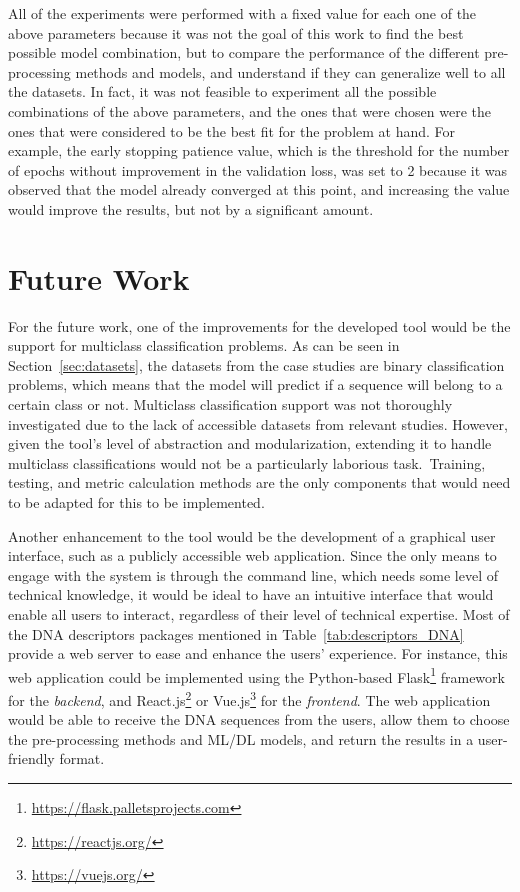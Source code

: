 All of the experiments were performed with a fixed value for each one of the above parameters because it was not the goal of this work to find the best possible model combination, but to compare the performance of the different pre-processing methods and models, and understand if they can generalize well to all the datasets. In fact, it was not feasible to experiment all the possible combinations of the above parameters, and the ones that were chosen were the ones that were considered to be the best fit for the problem at hand. For example, the early stopping patience value, which is the threshold for the number of epochs without improvement in the validation loss, was set to 2 because it was observed that the model already converged at this point, and increasing the value would improve the results, but not by a significant amount. 

\section{Future Work}

For the future work, one of the improvements for the developed tool would be the support for multiclass classification problems. As can be seen in Section~\ref{sec:datasets}, the datasets from the case studies are binary classification problems, which means that the model will predict if a sequence will belong to a certain class or not. Multiclass classification support was not thoroughly investigated due to the lack of accessible datasets from relevant studies. However, given the tool's level of abstraction and modularization, extending it to handle multiclass classifications would not be a particularly laborious task. Training, testing, and metric calculation methods are the only components that would need to be adapted for this to be implemented.

Another enhancement to the tool would be the development of a graphical user interface, such as a publicly accessible web application. Since the only means to engage with the system is through the command line, which needs some level of technical knowledge, it would be ideal to have an intuitive interface that would enable all users to interact, regardless of their level of technical expertise. Most of the \gls{DNA} descriptors packages mentioned in Table~\ref{tab:descriptors_DNA} provide a web server to ease and enhance the users' experience. For instance, this web application could be implemented using the Python-based Flask\footnote{\href{https://flask.palletsprojects.com/en/2.2.x/}{https://flask.palletsprojects.com}} framework for the \textit{backend}, and React.js\footnote{\href{https://reactjs.org/}{https://reactjs.org/}} or Vue.js\footnote{\href{https://vuejs.org/}{https://vuejs.org/}} for the \textit{frontend}. The web application would be able to receive the \gls{DNA} sequences from the users, allow them to choose the pre-processing methods and \gls{ML}/\gls{DL} models, and return the results in a user-friendly format.


